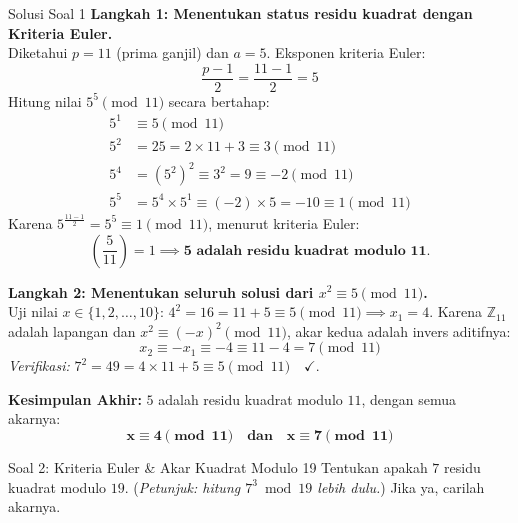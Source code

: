 \documentclass[11pt,a4paper]{article}
\begin{document}
\begin{solusibox}{Solusi Soal 1}
\textbf{Langkah 1: Menentukan status residu kuadrat dengan Kriteria Euler.} \\
Diketahui $p = 11$ (prima ganjil) dan $a = 5$. Eksponen kriteria Euler:
\[
\frac{p-1}{2} = \frac{11 - 1}{2} = 5
\]
Hitung nilai $5^5 \pmod{11}$ secara bertahap:
\begin{align*}
5^1 &\equiv 5 \pmod{11} \\
5^2 &= 25 = 2 \times 11 + 3 \equiv 3 \pmod{11} \\
5^4 &= (5^2)^2 \equiv 3^2 = 9 \equiv -2 \pmod{11} \\
5^5 &= 5^4 \times 5^1 \equiv (-2) \times 5 = -10 \equiv 1 \pmod{11}
\end{align*}
Karena $5^{\frac{11-1}{2}} = 5^5 \equiv 1 \pmod{11}$, menurut kriteria Euler:
\[
\left(\frac{5}{11}\right) = 1 \implies \mathbf{5 \text{ adalah residu kuadrat modulo } 11.}
\]

\textbf{Langkah 2: Menentukan seluruh solusi dari $x^2 \equiv 5 \pmod{11}$.} \\
Uji nilai $x \in \{1, 2, \ldots, 10\}$:
$4^2 = 16 = 11 + 5 \equiv 5 \pmod{11} \implies x_1 = 4$.  
Karena $\mathbb{Z}_{11}$ adalah lapangan dan $x^2 \equiv (-x)^2 \pmod{11}$, akar kedua adalah invers aditifnya:
\[
x_2 \equiv -x_1 \equiv -4 \equiv 11 - 4 = 7 \pmod{11}
\]
\textit{Verifikasi:} $7^2 = 49 = 4 \times 11 + 5 \equiv 5 \pmod{11} \quad \checkmark$.

\vspace{0.1cm}
\textbf{Kesimpulan Akhir:} $5$ adalah residu kuadrat modulo $11$, dengan semua akarnya:
\[
\mathbf{x \equiv 4 \pmod{11} \quad \text{dan} \quad x \equiv 7 \pmod{11}}
\]
\end{solusibox}

\newpage

\begin{soalbox}{Soal 2: Kriteria Euler \& Akar Kuadrat Modulo 19}
Tentukan apakah $7$ residu kuadrat modulo $19$. (\textit{Petunjuk: hitung $7^3 \bmod 19$ lebih dulu.}) Jika ya, carilah akarnya.
\end{soalbox}
\end{document}
